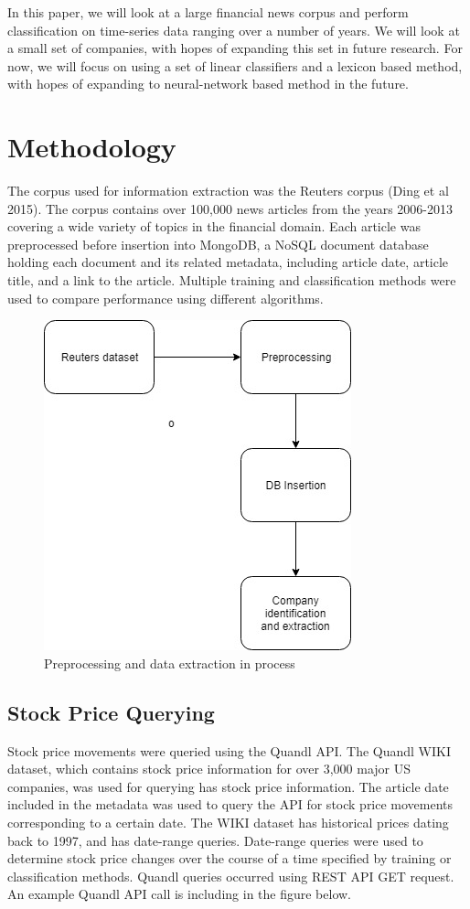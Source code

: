 \documentclass{article}
\begin{document}
    In this paper, we will look at a large financial news corpus and perform classification on time-series data ranging over a number of years. We will look at a small set of companies, with hopes of expanding this set in future research. For now, we will focus on using a set of linear classifiers and a lexicon based method, with hopes of expanding to neural-network based method in the future.

\section{Methodology}
    The corpus used for information extraction was the Reuters corpus (Ding et al 2015). The corpus contains over 100,000 news articles from the years 2006-2013 covering a wide variety of topics in the financial domain. Each article was preprocessed before insertion into MongoDB, a NoSQL document database holding each document and its related metadata, including article date, article title, and a link to the article. Multiple training and classification methods were used to compare performance using different algorithms.  
    
    \begin{figure}
        \centering
        \includegraphics[scale=0.5]{Extraction.jpg}
        \caption{Preprocessing and data extraction in process}
        \label{fig:my_label}
    \end{figure}
    
    \subsection{Stock Price Querying}
    Stock price movements were queried using the Quandl API. The Quandl WIKI dataset, which contains stock price information for over 3,000 major US companies, was used for querying has stock price information.  The article date included in the metadata was used to query the API for stock price movements corresponding to a certain date. The WIKI dataset has historical prices dating back to 1997, and has date-range queries. Date-range queries were used to determine stock price changes over the course of a time specified by training or classification methods. Quandl queries occurred using REST API GET request. An example Quandl API call is including in the figure below.
    
\end{document}
